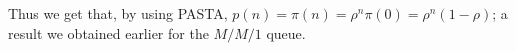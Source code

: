 \begin{exercise}
\begin{solution}
Thus we get that, by using PASTA, $p(n) = \pi(n) = \rho^n \pi(0) = \rho^n (1-\rho)$; a result we
obtained earlier for the $M/M/1$ queue.
\end{solution}
\end{exercise}









